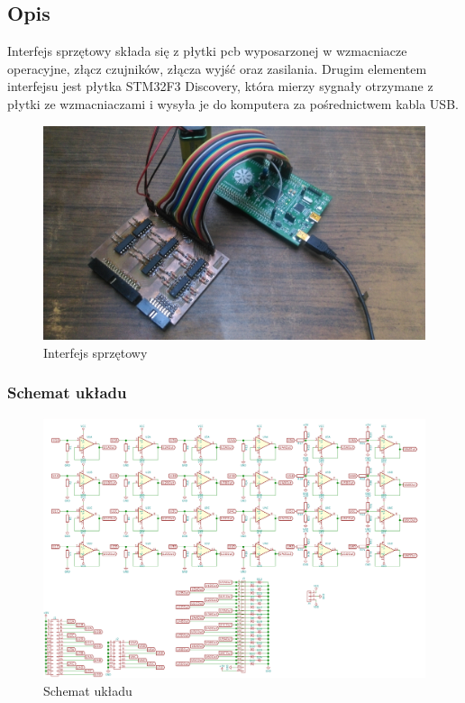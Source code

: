 \documentclass{article}
\begin{document}
\subsection{Opis}
Interfejs sprzętowy składa się z płytki pcb wyposarzonej w wzmacniacze operacyjne, złącz czujników, złącza wyjść oraz zasilania. 
Drugim elementem interfejsu jest płytka STM32F3 Discovery, która mierzy sygnały otrzymane z płytki ze wzmacniaczami i wysyła je do komputera za pośrednictwem kabla USB.
\begin{figure}[H]
	\centering
	\includegraphics[width=12cm]{interfejs+discovery.jpg}
	\caption{Interfejs sprzętowy}
	\label{rys:interfejs_sprzetowy}
\end{figure}

\subsubsection{Schemat układu}

\begin{figure}[H]
	\centering
	\includegraphics[width=15cm]{schemat.png}
	\caption{Schemat układu}
	\label{rys:schemat_ukladu}
\end{figure}
\end{document}
